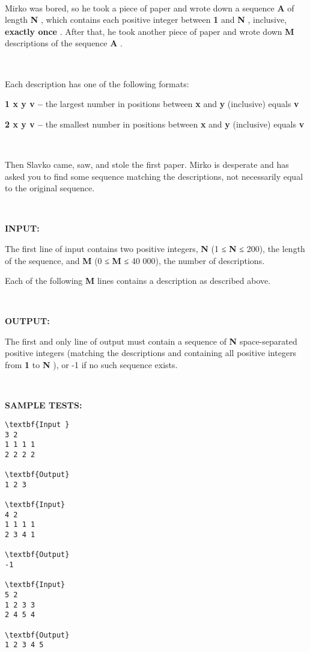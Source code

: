 

 

Mirko was bored, so he took a piece of paper and wrote down a sequence \textbf{ A } of length \textbf{ N } , which contains each positive integer between \textbf{ 1 } and \textbf{ N } , inclusive, \textbf{ exactly once } . After that, he took another piece of paper and wrote down \textbf{ M } descriptions of the sequence \textbf{ A } .

 

Each description has one of the following formats:

\textbf{1 x y v – } the largest number in positions between \textbf{ x } and \textbf{ y } (inclusive) equals \textbf{ v }

\textbf{2 x y v – } the smallest number in positions between \textbf{ x } and \textbf{ y } (inclusive) equals \textbf{ v }

 

Then Slavko came, saw, and stole the first paper. Mirko is desperate and has asked you to find some sequence matching the descriptions, not necessarily equal to the original sequence.

 

\textbf{INPUT: }\textbf{}

The first line of input contains two positive integers, \textbf{ N } (1 ≤ \textbf{ N } ≤ 200), the length of the sequence, and \textbf{ M } (0 ≤ \textbf{ M } ≤ 40 000), the number of descriptions.

Each of the following \textbf{ M } lines contains a description as described above.

 

\textbf{OUTPUT: }

The first and only line of output must contain a sequence of \textbf{ N } space-separated positive integers (matching the descriptions and containing all positive integers from \textbf{ 1 } to \textbf{ N } ), or -1 if no such sequence exists.

 

\textbf{SAMPLE TESTS: }
\begin{verbatim}
\textbf{Input }
3 2
1 1 1 1
2 2 2 2

\textbf{Output}
1 2 3

\textbf{Input}
4 2
1 1 1 1
2 3 4 1

\textbf{Output}
-1

\textbf{Input}
5 2
1 2 3 3
2 4 5 4

\textbf{Output}
1 2 3 4 5\end{verbatim}